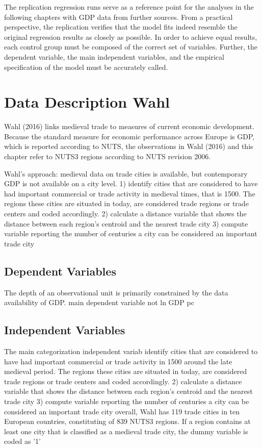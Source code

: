 \documentclass[
12pt, %
english, %
onehalfspacing, %
oneside,
headsepline, %
openany
]{MastersDoctoralThesis} %
\begin{document}
The replication regression runs serve as a reference point for the analyses in the following chapters with GDP data from further sources. From a practical perspective, the replication verifies that the model fits indeed resemble the original regression results as closely as possible. In order to achieve equal results, each control group must be composed of the correct set of variables. Further, the dependent variable, the main independent variables, and the empirical specification of the model must be accurately called.

\section{Data Description Wahl}

Wahl (2016) links medieval trade to measures of current economic development. Because the standard measure for economic performance across Europe is GDP, which is reported according to NUTS, the observations in Wahl (2016) and this chapter refer to NUTS3 regions according to NUTS revision 2006. 

Wahl's approach: medieval data on trade cities is available, but contemporary GDP is not available on a city level.
1) identify cities that are considered to have had important commercial or trade activity in medieval times, that is 1500. The regions these cities are situated in today, are considered trade regions or trade centers and coded accordingly.
2) calculate a distance variable that shows the distance between each region's centroid and the nearest trade city
3) compute variable reporting the number of centuries a city can be considered an important trade city

\subsection{Dependent Variables}
The depth of an observational unit is primarily constrained by the data availability of GDP.
main dependent variable not 
ln GDP pc

\subsection{Independent Variables}

The main categorization   independent variab identify cities that are considered to have had important commercial or trade activity in 1500 around the late medieval period. The regions these cities are situated in today, are considered trade regions or trade centers and coded accordingly.
2) calculate a distance variable that shows the distance between each region's centroid and the nearest trade city
3) compute variable reporting the number of centuries a city can be considered an important trade city
overall, Wahl has 119 trade cities in ten European countries, constituting of 839 NUTS3 regions.
If a region contains at least one city that is classified as a medieval trade city, the dummy variable is coded as '1'
\end{document}
